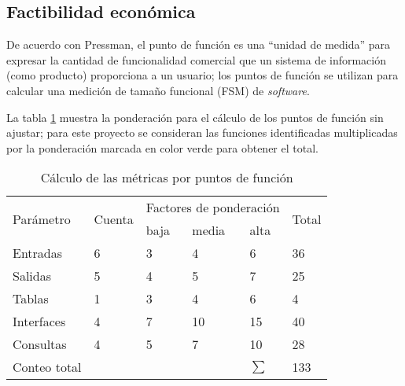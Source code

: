 \subsection{Factibilidad económica}

De acuerdo con Pressman\cite{pressman_software_2005}, el punto de función es una ``unidad de medida'' para expresar la cantidad de funcionalidad comercial que un sistema de información (como producto) proporciona a un usuario; los puntos de función se utilizan para calcular una medición de tamaño funcional (FSM) de \textit{software}.

La tabla \ref{tab:function_point_metrics} muestra la ponderación para el cálculo de los puntos de función sin ajustar; para este proyecto se consideran las funciones identificadas multiplicadas por la ponderación marcada en color verde para obtener el total.


\begin{table}[H]
	\centering
	\begin{tabular}{|l|l|l|l|l|l|}
	\hline
	\multirow{2}{*}{Parámetro} & \multirow{2}{*}{Cuenta} & \multicolumn{3}{|l|}{Factores de ponderación} & \multirow{2}{*}{Total} \\ \cline{3-5}
														 &                         & baja       	& media       & alta		       &                        \\ \hline
	Entradas                   & 6                       & 3            & 4           & \cellcolor[HTML]{66BB6A} 6              & 36 \\ \hline
	Salidas                     & 5                       & 4            & \cellcolor[HTML]{66BB6A} 5           & 7              & 25 \\ \hline
	Tablas                     & 1                       & 3            &\cellcolor[HTML]{66BB6A} 4           & 6              & 4 \\ \hline
	Interfaces                 & 4                       & 7            &\cellcolor[HTML]{66BB6A} 10          & 15             & 40 \\ \hline
	Consultas                  & 4                       & 5            &\cellcolor[HTML]{66BB6A} 7           & 10             & 28 \\ \hline
	Conteo total               &                         &              &             &		    $ \sum $         &\cellcolor[HTML]{66BB6A} 133 \\ \hline
	\end{tabular}
	\caption{Cálculo de las métricas por puntos de función}
	\label{tab:function_point_metrics}
\end{table}


